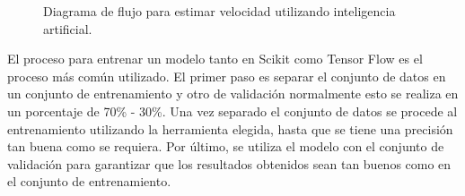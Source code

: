\begin{figure}[H]
    \centering
    \caption{Diagrama de flujo para estimar velocidad utilizando inteligencia artificial.}
    \label{fig:ModeloScikitTensorFlow}
\end{figure}


El proceso para entrenar un modelo tanto en Scikit como Tensor Flow es el proceso más común utilizado. El primer paso es separar el conjunto de datos en un conjunto de entrenamiento y otro de validación normalmente esto se realiza en un porcentaje de 70\% - 30\%. Una vez separado el conjunto de datos se procede al entrenamiento utilizando la herramienta elegida, hasta que se tiene una precisión tan buena como se requiera. Por último, se utiliza el modelo con el conjunto de validación para garantizar que los resultados obtenidos sean tan buenos como en el conjunto de entrenamiento.

